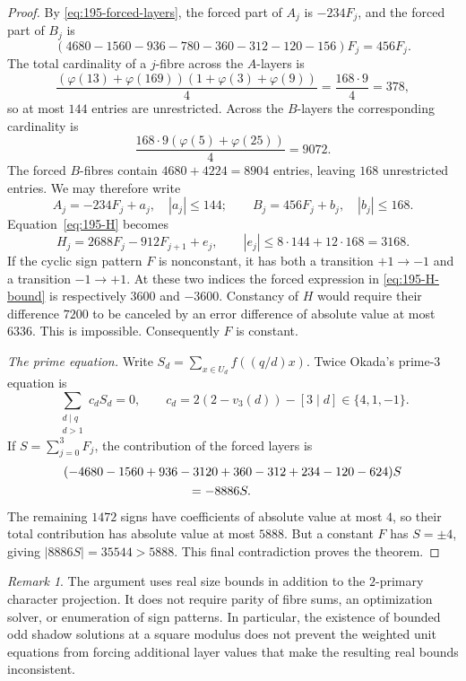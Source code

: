 \documentclass[11pt]{amsart}
\theoremstyle{definition}
\theoremstyle{remark}
\newtheorem{remark}[theorem]{Remark}
\numberwithin{equation}{section}
\begin{document}
\begin{proof}
By \eqref{eq:195-forced-layers}, the forced part of $A_j$ is $-234F_j$,
and the forced part of $B_j$ is
\[
 (4680-1560-936-780-360-312-120-156)F_j=456F_j.
\]
The total cardinality of a $j$-fibre across the $A$-layers is
\[
 \frac{(\varphi(13)+\varphi(169))(1+\varphi(3)+\varphi(9))}{4}
 =\frac{168\cdot9}{4}=378,
\]
so at most $144$ entries are unrestricted.
Across the $B$-layers the corresponding cardinality is
\[
 \frac{168\cdot9(\varphi(5)+\varphi(25))}{4}=9072.
\]
The forced $B$-fibres contain $4680+4224=8904$ entries, leaving $168$
unrestricted entries.
We may therefore write
\[
 A_j=-234F_j+a_j,\quad |a_j|\le144;\qquad
 B_j=456F_j+b_j,\quad |b_j|\le168.
\]
Equation~\eqref{eq:195-H} becomes
\begin{equation}\label{eq:195-H-bound}
 H_j=2688F_j-912F_{j+1}+e_j,
 \qquad |e_j|\le8\cdot144+12\cdot168=3168.
\end{equation}
If the cyclic sign pattern $F$ is nonconstant, it has both a transition
$+1\to-1$ and a transition $-1\to+1$.
At these two indices the forced expression in
\eqref{eq:195-H-bound} is respectively $3600$ and $-3600$.
Constancy of $H$ would require their difference $7200$ to be canceled by
an error difference of absolute value at most $6336$.
This is impossible.  Consequently $F$ is constant.

\smallskip\noindent
\emph{The prime equation.}
Write $S_d=\sum_{x\in U_d}f((q/d)x)$.
Twice Okada's prime-$3$ equation is
\[
 \sum_{\substack{d\mid q\\d>1}}c_dS_d=0,
 \qquad c_d=2(2-v_3(d))-[3\mid d]\in\{4,1,-1\}.
\]
If $S=\sum_{j=0}^3F_j$, the contribution of the forced layers is
\[
 \begin{split}
 &(-4680-1560+936-3120+360-312+234-120-624)S\\
 &\hspace{35mm}=-8886S.
 \end{split}
\]
The remaining $1472$ signs have coefficients of absolute value at most $4$,
so their total contribution has absolute value at most $5888$.
But a constant $F$ has $S=\pm4$, giving $|8886S|=35544>5888$.
This final contradiction proves the theorem.
\end{proof}

\begin{remark}
The argument uses real size bounds in addition to the $2$-primary character
projection.  It does not require parity of fibre sums, an optimization
solver, or enumeration of sign patterns.
In particular, the existence of bounded odd shadow solutions at a square
modulus does not prevent the weighted unit equations from forcing additional
layer values that make the resulting real bounds inconsistent.
\end{remark}
\end{document}
